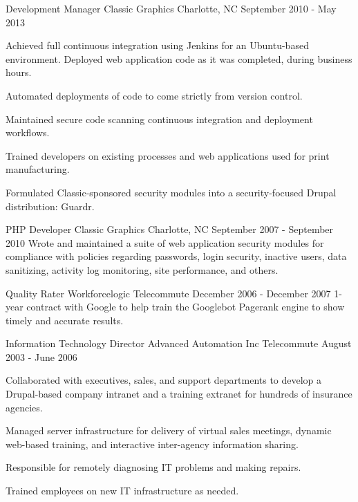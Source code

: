 \begin{cventries}

\cventry
{Development Manager}
{Classic Graphics} %
{Charlotte, NC} %
{September 2010 - May 2013} %
{
Achieved full continuous integration using Jenkins for an Ubuntu-based environment. Deployed web application code as it was completed, during business hours.
\begin{cvitems}
\item[]
\item {Automated deployments of code to come strictly from version control.}
\item {Maintained secure code scanning continuous integration and deployment workflows.}
\item {Trained developers on existing processes and web applications used for print manufacturing.}
\item {Formulated Classic-sponsored security modules into a security-focused Drupal distribution: Guardr.}
\end{cvitems}
}


\cventry
{PHP Developer}
{Classic Graphics} %
{Charlotte, NC} %
{September 2007 - September 2010} %
{
Wrote and maintained a suite of web application security modules for compliance with policies regarding passwords, login security, inactive users, data sanitizing, activity log monitoring, site performance, and others.
}

\cventry
{Quality Rater}
{Workforcelogic}
{Telecommute}
{December 2006 - December 2007} %
{ %
1-year contract with Google to help train the Googlebot Pagerank engine to show timely and accurate results.
}


\cventry
{Information Technology Director}
{Advanced Automation Inc}
{Telecommute}
{August 2003 - June 2006} %
{ %
Collaborated with executives, sales, and support departments to develop a Drupal-based company intranet and a training extranet for hundreds of insurance agencies.
\begin{cvitems}
\item[]
\item {Managed server infrastructure for delivery of virtual sales meetings, dynamic web-based training, and interactive inter-agency information sharing.}
\item {Responsible for remotely diagnosing IT problems and making repairs. }
\item {Trained employees on new IT infrastructure as needed. }
\end{cvitems}
}


\end{cventries}
